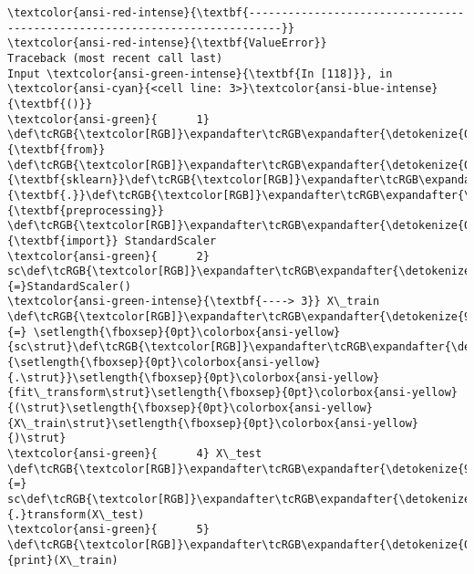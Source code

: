 \documentclass[11pt]{article}
\begin{document}
    \begin{Verbatim}[commandchars=\\\{\}, frame=single, framerule=2mm, rulecolor=\color{outerrorbackground}]
\textcolor{ansi-red-intense}{\textbf{---------------------------------------------------------------------------}}
\textcolor{ansi-red-intense}{\textbf{ValueError}}                                Traceback (most recent call last)
Input \textcolor{ansi-green-intense}{\textbf{In [118]}}, in \textcolor{ansi-cyan}{<cell line: 3>}\textcolor{ansi-blue-intense}{\textbf{()}}
\textcolor{ansi-green}{      1} \def\tcRGB{\textcolor[RGB]}\expandafter\tcRGB\expandafter{\detokenize{0,135,0}}{\textbf{from}} \def\tcRGB{\textcolor[RGB]}\expandafter\tcRGB\expandafter{\detokenize{0,0,255}}{\textbf{sklearn}}\def\tcRGB{\textcolor[RGB]}\expandafter\tcRGB\expandafter{\detokenize{0,0,255}}{\textbf{.}}\def\tcRGB{\textcolor[RGB]}\expandafter\tcRGB\expandafter{\detokenize{0,0,255}}{\textbf{preprocessing}} \def\tcRGB{\textcolor[RGB]}\expandafter\tcRGB\expandafter{\detokenize{0,135,0}}{\textbf{import}} StandardScaler
\textcolor{ansi-green}{      2} sc\def\tcRGB{\textcolor[RGB]}\expandafter\tcRGB\expandafter{\detokenize{98,98,98}}{=}StandardScaler()
\textcolor{ansi-green-intense}{\textbf{----> 3}} X\_train \def\tcRGB{\textcolor[RGB]}\expandafter\tcRGB\expandafter{\detokenize{98,98,98}}{=} \setlength{\fboxsep}{0pt}\colorbox{ansi-yellow}{sc\strut}\def\tcRGB{\textcolor[RGB]}\expandafter\tcRGB\expandafter{\detokenize{98,98,98}}{\setlength{\fboxsep}{0pt}\colorbox{ansi-yellow}{.\strut}}\setlength{\fboxsep}{0pt}\colorbox{ansi-yellow}{fit\_transform\strut}\setlength{\fboxsep}{0pt}\colorbox{ansi-yellow}{(\strut}\setlength{\fboxsep}{0pt}\colorbox{ansi-yellow}{X\_train\strut}\setlength{\fboxsep}{0pt}\colorbox{ansi-yellow}{)\strut}
\textcolor{ansi-green}{      4} X\_test \def\tcRGB{\textcolor[RGB]}\expandafter\tcRGB\expandafter{\detokenize{98,98,98}}{=} sc\def\tcRGB{\textcolor[RGB]}\expandafter\tcRGB\expandafter{\detokenize{98,98,98}}{.}transform(X\_test)
\textcolor{ansi-green}{      5} \def\tcRGB{\textcolor[RGB]}\expandafter\tcRGB\expandafter{\detokenize{0,135,0}}{print}(X\_train)


\end{Verbatim}
\end{document}

